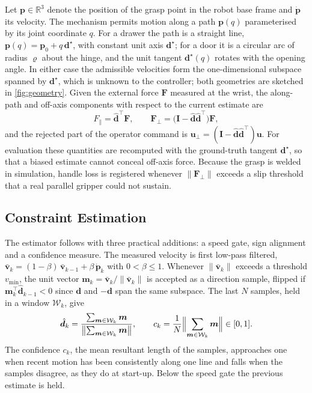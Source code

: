 \documentclass[11pt,letterpaper]{article}
\newcommand{\vect}[1]{\bm{#1}}
\newcommand{\I}{\mathbf{I}}
\newcommand{\vuser}{\vect{u}}
\newcommand{\Fext}{\vect{F}}
\newcommand{\Fperp}{\vect{F}_{\perp}}
\newcommand{\Fpar}{F_{\parallel}}
\begin{document}
Let $\vect p\in\mathbb R^3$ denote the position of the grasp point in the robot base frame and $\dot{\vect p}$ its velocity. The mechanism permits motion along a path $\vect p(q)$ parameterised by its joint coordinate $q$. For a drawer the path is a straight line, $\vect p(q)=\vect p_0+q\,\vect d^\star$, with constant unit axis $\vect d^\star$; for a door it is a circular arc of radius $\varrho$ about the hinge, and the unit tangent $\vect d^\star(q)$ rotates with the opening angle. In either case the admissible velocities form the one-dimensional subspace spanned by $\vect d^\star$, which is unknown to the controller; both geometries are sketched in \cref{fig:geometry}. Given the external force $\Fext$ measured at the wrist, the along-path and off-axis components with respect to the current estimate are
\begin{equation}
  \Fpar = \hat{\vect d}^{\top}\Fext, \qquad
  \Fperp = \bigl(\I-\hat{\vect d}\hat{\vect d}^{\top}\bigr)\Fext,
  \label{eq:forcesplit}
\end{equation}
and the rejected part of the operator command is $\vuser_\perp=(\I-\hat{\vect d}\hat{\vect d}^{\top})\vuser$. For evaluation these quantities are recomputed with the ground-truth tangent $\vect d^\star$, so that a biased estimate cannot conceal off-axis force. Because the grasp is welded in simulation, handle loss is registered whenever $\lVert\Fperp\rVert$ exceeds a slip threshold that a real parallel gripper could not sustain.



\subsection{Constraint Estimation}
\label{sec:estimator}



The estimator follows \cite{lutscher2010control} with three practical additions: a speed gate, sign alignment and a confidence measure. The measured velocity is first low-pass filtered, $\bar{\vect v}_k = (1-\beta)\,\bar{\vect v}_{k-1} + \beta\,\dot{\vect p}_k$ with $0<\beta\le 1$. Whenever $\lVert\bar{\vect v}_k\rVert$ exceeds a threshold $v_{\min}$, the unit vector $\vect m_k=\bar{\vect v}_k/\lVert\bar{\vect v}_k\rVert$ is accepted as a direction sample, flipped if $\vect m_k^{\top}\hat{\vect d}_{k-1}<0$ since $\vect d$ and $-\vect d$ span the same subspace. The last $N$ samples, held in a window $\mathcal W_k$, give
\begin{equation}
  \hat{\vect d}_k = \frac{\sum_{\vect m\in\mathcal W_k}\vect m}{\bigl\lVert\sum_{\vect m\in\mathcal W_k}\vect m\bigr\rVert},
  \qquad
  c_k = \frac{1}{N}\Bigl\lVert\sum_{\vect m\in\mathcal W_k}\vect m\Bigr\rVert \in[0,1].
  \label{eq:estimator}
\end{equation}
The confidence $c_k$, the mean resultant length of the samples, approaches one when recent motion has been consistently along one line and falls when the samples disagree, as they do at start-up. Below the speed gate the previous estimate is held.
\end{document}
